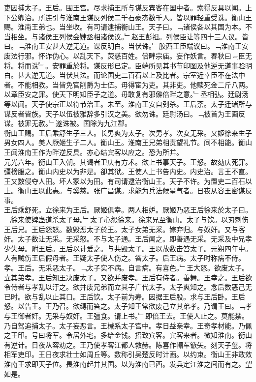 \documentclass{zhvt-classic}
\begin{document}
\hspace*{2em}吏因捕太子。王后。围王宫。尽求捕王所与谋反宾客在国中者。索得反具以闻。上下公卿治。所连引与淮南王谋反列侯二千石豪杰数千人。皆以罪轻重受诛。衡山王赐。淮南王弟也。当坐收。有司请逮捕衡山王。天子曰。﹁诸侯各以其国为本。不当相坐。与诸侯王列侯会肄丞相诸侯议。﹂赵王彭祖。列侯臣让等四十三人议。皆曰。﹁淮南王安甚大逆无道。谋反明白。当伏诛。﹂胶西王臣端议曰。﹁淮南王安废法行邪。怀诈伪心。以乱天下。荧惑百姓。倍畔宗庙。妄作妖言。春秋曰﹃臣无将。将而诛﹄。安罪重於将。谋反形已定。臣端所见其书节印图及他逆无道事验明白。甚大逆无道。当伏其法。而论国吏二百石以上及比者。宗室近幸臣不在法中者。不能相教。当皆免官削爵为士伍。毋得宦为吏。其非吏。他赎死金二斤八两。以章臣安之罪。使天下明知臣子之道。毋敢复有邪僻倍畔之意。﹂丞相弘。廷尉汤等以闻。天子使宗正以符节治王。未至。淮南王安自刭杀。王后荼。太子迁诸所与谋反者皆族。天子以伍被雅辞多引汉之美。欲勿诛。廷尉汤曰。﹁被首为王画反谋。被罪无赦。﹂遂诛被。国除为九江郡。\\
\hspace*{2em}衡山王赐。王后乘舒生子三人。长男爽为太子。次男孝。次女无采。又姬徐来生子男女四人。美人厥姬生子二人。衡山王。淮南王兄弟相责望礼节。间不相能。衡山王闻淮南王作为畔逆反具。亦心结宾客以应之。恐为所并。\\
\hspace*{2em}元光六年。衡山王入朝。其谒者卫庆有方术。欲上书事天子。王怒。故劾庆死罪。彊榜服之。衡山内史以为非是。卻其狱。王使人上书告内史。内史治。言王不直。王又数侵夺人田。坏人冢以为田。有司请逮治衡山王。天子不许。为置吏二百石以上。衡山王以此恚。与奚慈。张广昌谋。求能为兵法候星气者。日夜从容王密谋反事。\\
\hspace*{2em}王后乘舒死。立徐来为王后。厥姬俱幸。两人相妒。厥姬乃恶王后徐来於太子曰。﹁徐来使婢蛊道杀太子母。﹂太子心怨徐来。徐来兄至衡山。太子与饮。以刃刺伤王后兄。王后怨怒。数毁恶太子於王。太子女弟无采。嫁弃归。与奴奸。又与客奸。太子数让无采。无采怒。不与太子通。王后闻之。即善遇无采。无采及中兄孝少失母。附王后。王后以计爱之。与共毁太子。王以故数击笞太子。元朔四年中。人有贼伤王后假母者。王疑太子使人伤之。笞太子。后王病。太子时称病不侍。孝。王后。无采恶太子。﹁太子实不病。自言病。有喜色。﹂王大怒。欲废太子。立其弟孝。王后知王决废太子。又欲并废孝。王后有侍者。善舞。王幸之。王后欲令侍者与孝乱以汙之。欲并废兄弟而立其子广代太子。太子爽知之。念后数恶己无已时。欲与乱以止其口。王后饮。太子前为寿。因据王后股。求与王后卧。王后怒。以告王。王乃召。欲缚而笞之。太子知王常欲废己立其弟孝。乃谓王曰。﹁孝与王御者奸。无采与奴奸。王彊食。请上书。﹂即倍王去。王使人止之。莫能禁。乃自驾追捕太子。太子妄恶言。王械系太子宫中。孝日益亲幸。王奇孝材能。乃佩之王印。号曰将军。令居外宅。多给金钱。招致宾客。宾客来者。微知淮南。衡山有逆计。日夜从容劝之。王乃使孝客江都人救赫。陈喜作輣车镞矢。刻天子玺。将相军吏印。王日夜求壮士如周丘等。数称引吴楚反时计画。以约束。衡山王非敢效淮南王求即天子位。畏淮南起并其国。以为淮南已西。发兵定江淮之间而有之。望如是。\\
\end{document}
